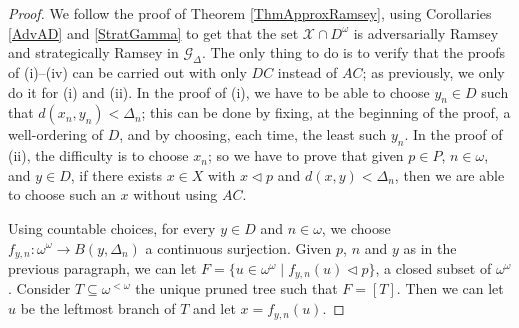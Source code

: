 \documentclass[a4paper,11pt]{article}
\theoremstyle{definition}
\numberwithin{equation}{section}
\newcommand{\X}{\mathcal{X}}
\newcommand{\G}{\mathcal{G}}
\begin{document}
\begin{proof}

We follow the proof of Theorem \ref{ThmApproxRamsey}, using Corollaries \ref{AdvAD} and \ref{StratGamma} to get that the set $\X \cap D^\omega$ is adversarially Ramsey and strategically Ramsey in $\G_\Delta$. The only thing to do is to verify that the proofs of (i)--(iv) can be carried out with only $DC$ instead of $AC$; as previously, we only do it for (i) and (ii). In the proof of (i), we have to be able to choose $y_n \in D$ such that $d(x_n, y_n) < \Delta_n$; this can be done by fixing, at the beginning of the proof, a well-ordering of $D$, and by choosing, each time, the least such $y_n$. In the proof of (ii), the difficulty is to choose $x_n$; so we have to prove that given $p \in P$, $n \in \omega$, and $y \in D$, if there exists $x \in X$ with $x \vartriangleleft p$ and $d(x, y) < \Delta_n$, then we are able to choose such an $x$ without using $AC$.

\smallskip

Using countable choices, for every $y \in D$ and $n \in \omega$, we choose $f_{y, n} : \omega^\omega \longrightarrow B(y, \Delta_n)$ a continuous surjection. Given $p$, $n$ and $y$ as in the previous paragraph, we can let $F=\{u \in \omega^\omega \mid f_{y, n}(u) \vartriangleleft p\}$, a closed subset of $\omega^\omega$. Consider $T \subseteq \omega^{< \omega}$ the unique pruned tree such that $F = [T]$. Then we can let $u$ be the leftmost branch of $T$ and let $x = f_{y, n}(u)$.

\end{proof}
\end{document}
